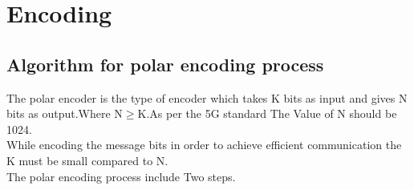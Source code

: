 \documentclass[journal,5pt,twocolumn]{IEEEtran}
\begin{document}
\section{\textbf{Encoding}}
\subsection{\textbf{Algorithm for polar encoding process}}
\raggedright The polar encoder is the type of encoder which takes K bits as input and gives N bits as output.Where N$\ge$K.As per the 5G standard The Value of N should be 1024. \vspace{5mm} \\
While encoding the message bits in order to achieve efficient communication the K must be small compared to N. \\
The polar encoding process include Two steps.
\end{document}
